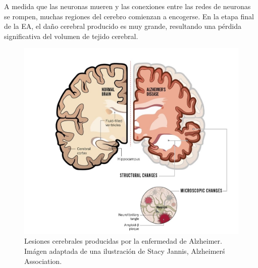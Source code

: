 A medida que las neuronas mueren y las conexiones entre las redes de neuronas se rompen, muchas regiones del cerebro
comienzan a encogerse.
En la etapa final de la EA, el daño cerebral producido es muy grande, resultando una pérdida significativa del volumen
de tejido cerebral.

\begin{figure}[H]
    \centering
    \includegraphics[width=\textwidth]{./imgs/lesiones-cerebrales}
    \caption{Lesiones cerebrales producidas por la enfermedad de Alzheimer.\\Imágen adaptada de una
    ilustración de Stacy Jannis, Alzheimer\'s Association.}
    \label{fig:lesiones-cerebrales}
\end{figure}


